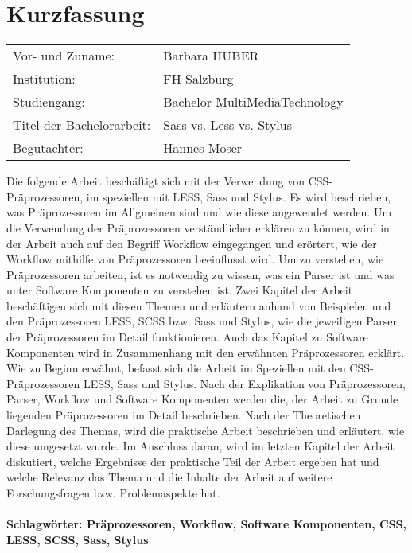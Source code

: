 \section*{Kurzfassung}
\begin{tabular}{l l}
Vor- und Zuname:& Barbara HUBER\\
Institution: & FH Salzburg\\ 
Studiengang: &  Bachelor MultiMediaTechnology\\ 
Titel der Bachelorarbeit: & Sass vs. Less vs. Stylus\\
Begutachter: & Hannes Moser\\ 
\end{tabular} 
\vspace{0.5cm}

Die folgende Arbeit beschäftigt sich mit der Verwendung von CSS-Präprozessoren, im speziellen mit LESS, Sass und Stylus. Es wird beschrieben, was Präprozessoren im Allgmeinen sind und wie diese angewendet werden. Um die Verwendung der Präprozessoren verständlicher erklären zu können, wird in der Arbeit auch auf den Begriff Workflow eingegangen und erörtert, wie der Workflow mithilfe von Präprozessoren beeinflusst wird. \newline
Um zu verstehen, wie Präprozessoren arbeiten, ist es notwendig zu wissen, was ein Parser ist und was unter Software Komponenten zu verstehen ist. Zwei Kapitel der Arbeit beschäftigen sich mit diesen Themen und erläutern anhand von Beispielen und den Präprozessoren LESS, SCSS bzw. Sass und Stylus, wie die jeweiligen Parser der Präprozessoren im Detail funktionieren. Auch das Kapitel zu Software Komponenten wird in Zusammenhang mit den erwähnten Präprozessoren erklärt.\newline
Wie zu Beginn erwähnt, befasst sich die Arbeit im Speziellen mit den CSS-Präprozessoren LESS, Sass und Stylus. \newline
Nach der Explikation von Präprozessoren, Parser, Workflow und Software Komponenten werden die, der Arbeit zu Grunde liegenden Präprozessoren im Detail beschrieben. \newline
Nach der Theoretischen Darlegung des Themas, wird die praktische Arbeit beschrieben und erläutert, wie diese umgesetzt wurde. Im Anschluss daran, wird im letzten Kapitel der Arbeit diskutiert, welche Ergebnisse der praktische Teil der Arbeit ergeben hat und welche Relevanz das Thema und die Inhalte der Arbeit auf weitere Forschungsfragen bzw. Problemaspekte hat.
\paragraph{Schlagwörter: Präprozessoren, Workflow, Software Komponenten, CSS, LESS, SCSS, Sass, Stylus}


